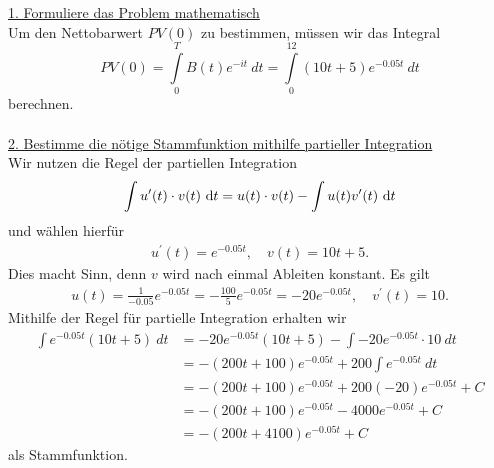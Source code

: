\underline{1. Formuliere das Problem mathematisch}\\
Um den Nettobarwert $PV(0)$ zu bestimmen, müssen wir das Integral
\begin{equation*}
PV(0)
=
\int \limits_0^T B(t) e^{-i t} \ dt
=
\int \limits_0^{12} (10 t + 5) e^{-0.05 t} \ dt
\end{equation*}
berechnen.\\
\\
\underline{2. Bestimme die nötige Stammfunktion mithilfe partieller Integration}\\
Wir nutzen die Regel der partiellen Integration
\begin{align*}
\int u^\prime(t) \cdot v(t) \ \text{\rmfamily d} t = u(t) \cdot v(t) - \int u(t) v^\prime(t)\ \text{\rmfamily d} t
\end{align*}
und wählen hierfür
\begin{equation*}
\begin{split}
u^\prime(t)  =  e^{-0.05 t},  \quad
v(t)  = 10 t +5.
\end{split}
\end{equation*}
Dies macht Sinn, denn $v$ wird nach einmal Ableiten konstant.
Es gilt 
\begin{equation*}
\begin{split}
u(t) = \frac{1}{-0.05} e^{-0.05t} 
=- \frac{100}{5} e^{-0.05t} = -20 e^{-0.05t}, \quad
v^\prime(t) = 10.
\end{split}
\end{equation*}
Mithilfe der Regel für partielle Integration erhalten wir
\begin{equation*}
\begin{split}
\int e^{-0.05 t} (10 t + 5)  \ dt
&= 
  -20  e^{-0.05 t} (10t +5)  - \int   -20 e^{-0.05t} \cdot 10  \ dt\\
&= -( 200 t + 100) e^{-0.05 t} + 200 \int e^{-0.05 t} \ dt\\
&=-(200 t + 100)  e^{-0.05t } + 200 (-20) e^{-0.05 t}  + C\\
&= -(200 t + 100) e^{-0.05 t } -4000 e^{-0.05t} + C \\
&= -(200 t +4100) e^{-0.05 t} + C
\end{split}
\end{equation*}
als Stammfunktion.\\

